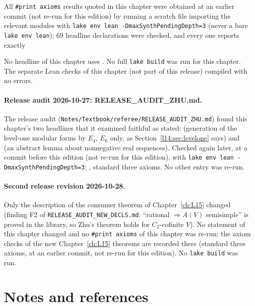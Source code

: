 All \texttt{\#print axioms} results quoted in this chapter were obtained at an earlier commit (not re-run for this edition) by running a scratch file
importing the relevant modules with \texttt{lake env lean -DmaxSynthPendingDepth=3} (never a bare \texttt{lake env lean}); 69
headline declarations were checked, and every one reports exactly
\begin{plaincode}
\end{plaincode}
No headline of this chapter uses . No full \texttt{lake build} was run for this chapter. The
separate Lean checks of this chapter (not part of this release) compiled with no errors.

\paragraph{Release audit 2026-10-27: RELEASE\_AUDIT\_ZHU.md.} The release audit
(\texttt{Notes/\allowbreak Textbook/\allowbreak referee/\allowbreak RELEASE\_AUDIT\_ZHU.md}) found this chapter's two headlines
that it examined faithful as stated:  (generation of the level-one modular forms by $E_4$, $E_6$
only, as Section~\ref{l14:sec:levelone} says) and  (an abstract lemma about
nonnegative real sequences). Checked again later, at a commit before this edition (not re-run for this edition), with \texttt{lake env lean -DmaxSynthPendingDepth=3}:
, standard three axioms. No other entry was re-run.

\paragraph{Second release revision 2026-10-28.} Only the description of the consumer theorem of Chapter~\ref{ch:L15} changed
(finding F2 of \texttt{RELEASE\_AUDIT\_NEW\_DECLS.md}: ``rational $\Rightarrow A(V)$ semisimple'' is proved in the library, so
Zhu's theorem holds for $C_2$-cofinite  $V$). No statement of this chapter changed and no
\texttt{\#print axioms} of this chapter was re-run; the axiom checks of the new Chapter~\ref{ch:L15} theorems are recorded
there (standard three axioms, at an earlier commit, not re-run for this edition). No \texttt{lake build} was run.

\section{Notes and references}\label{l14:sec:notes}

